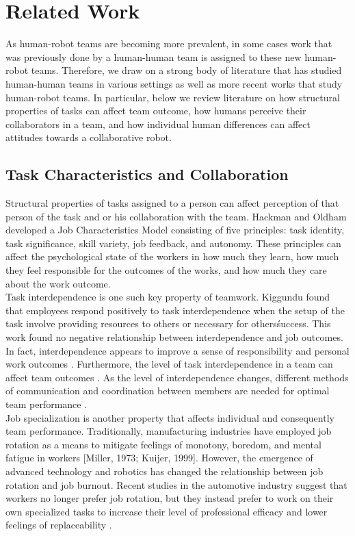 \section{Related Work}
       As human-robot teams are becoming more prevalent, in some cases work that was previously done by a human-human team is assigned to these new human-robot teams. Therefore, we draw on a strong body of literature that has studied human-human teams in various settings as well as more recent works that study human-robot teams. In particular, below we review literature on how structural properties of tasks can affect team outcome, how humans perceive their collaborators in a team, and how individual human differences can affect attitudes towards a collaborative robot.
\subsection{Task Characteristics and Collaboration}
       Structural properties of tasks assigned to a person can affect perception of that person of the task and or his collaboration with the team. Hackman and Oldham \cite{hackman1976motivation} developed a Job Characteristics Model consisting of five principles: task identity, task significance, skill variety, job feedback, and autonomy. These principles can affect the psychological state of the workers in how much they learn, how much they feel responsible for the outcomes of the works, and how much they care about the work outcome. \\
       Task interdependence is one such key property of teamwork. Kiggundu \cite{kiggundu1983task} found that employees respond positively to task interdependence when the setup of the task involve providing resources to others or necessary for others\' success. This work found no negative relationship between interdependence and job outcomes. In fact, interdependence appears to improve a sense of responsibility and personal  work outcomes \cite{van1998motivating}. Furthermore, the level of task interdependence in a team can affect team outcomes \cite{katz2005collective, langfred2005autonomy, liden1997task}. As the level of interdependence changes, different methods of communication and coordination between members are needed for optimal team performance \cite{espinosa2004explicit, butchibabu2016implicit}.\\
       Job specialization is another property that affects individual and consequently team performance. Traditionally, manufacturing industries have employed job rotation as a means to mitigate feelings of monotony, boredom, and mental fatigue in workers [Miller, 1973; Kuijer, 1999]. However, the emergence of advanced technology and robotics has changed the relationship between job rotation and job burnout.  Recent studies in the automotive industry suggest that workers no longer prefer job rotation, but they instead prefer to work on their own specialized tasks to increase their level of professional efficacy and lower feelings of replaceability \cite{hsieh2004reassessment}. \\
